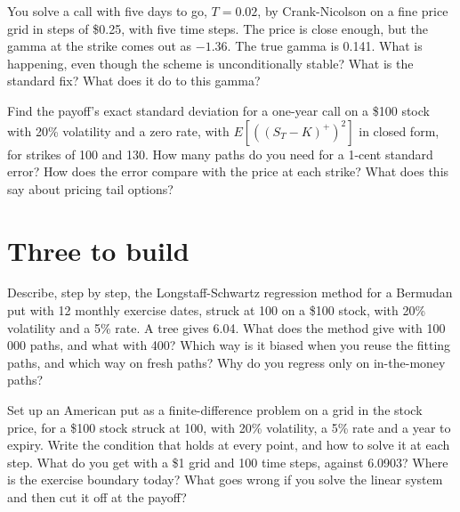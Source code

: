 \begin{question}\label{iq:iv2:pricing-and-numerics:46}
You solve a call with five days to go, $T = 0.02$, by Crank-Nicolson on a fine price grid in steps of \$0.25, with five time steps. The price is close enough, but the gamma at the strike comes out as $-1.36$. The true gamma is 0.141. What is happening, even though the scheme is unconditionally stable? What is the standard fix? What does it do to this gamma?
\end{question}

\begin{question}\label{iq:iv2:pricing-and-numerics:47}
Find the payoff's exact standard deviation for a one-year call on a \$100 stock with 20\% volatility and a zero rate, with $E[((S_T - K)^+)^2]$ in closed form, for strikes of 100 and 130. How many paths do you need for a 1-cent standard error? How does the error compare with the price at each strike? What does this say about pricing tail options?
\end{question}

\section{Three to build}

\begin{question}\label{iq:iv2:pricing-and-numerics:48}
Describe, step by step, the Longstaff-Schwartz regression method for a Bermudan put with 12 monthly exercise dates, struck at 100 on a \$100 stock, with 20\% volatility and a 5\% rate. A tree gives 6.04. What does the method give with 100\,000 paths, and what with 400? Which way is it biased when you reuse the fitting paths, and which way on fresh paths? Why do you regress only on in-the-money paths?
\end{question}

\begin{question}\label{iq:iv2:pricing-and-numerics:49}
Set up an American put as a finite-difference problem on a grid in the stock price, for a \$100 stock struck at 100, with 20\% volatility, a 5\% rate and a year to expiry. Write the condition that holds at every point, and how to solve it at each step. What do you get with a \$1 grid and 100 time steps, against 6.0903? Where is the exercise boundary today? What goes wrong if you solve the linear system and then cut it off at the payoff?
\end{question}

